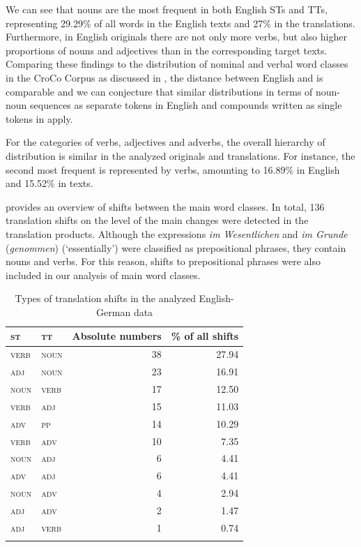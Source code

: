 \documentclass[output=paper]{LSP/langsci}
\begin{document}
We can see that nouns are the most frequent  in both English STs and  TTs, representing 29.29\% of all words in the English texts and 27\% in the  translations. Furthermore, in English originals there are not only more verbs, but also higher proportions of nouns and adjectives than in the corresponding  target texts. Comparing these findings to the distribution of nominal and verbal word classes in the CroCo Corpus as discussed in , the distance between English and  is comparable and we can conjecture that similar distributions in terms of noun-noun sequences as separate tokens in English and compounds written as single tokens in  apply. 

For the categories of verbs, adjectives and adverbs, the overall hierarchy of distribution is similar in the analyzed originals and translations. For instance, the second most frequent  is represented by verbs, amounting to 16.89\% in English and 15.52\% in  texts.

 provides an overview of shifts between the main word classes. In total, 136 translation shifts on the level of the main  changes were detected in the translation products.  Although the expressions \textit{im Wesentlichen} and \textit{im Grunde} (\textit{genommen}) (`essentially') were classified as prepositional phrases, they contain nouns and verbs. For this reason, shifts to prepositional phrases were also included in our analysis of main word classes. 

\begin{table}
\centering
\begin{tabular}{>{\scshape}l >{\scshape}l r r}
\lsptoprule
st   & tt &  Absolute numbers &  \% of all shifts \\ \midrule
verb & noun &  38 &  27.94\\
adj  & noun &  23 &  16.91\\
noun & verb &  17 &  12.50\\
verb & adj &  15 &  11.03\\
adv  & pp &  14 &  10.29\\
verb & adv &  10 &  7.35\\
noun & adj &  6 &  4.41\\
adv  & adj &  6 &  4.41\\
noun & adv &  4 &  2.94\\
adj  & adv &  2 &  1.47\\
adj  & verb &  1 &  0.74\\
\lspbottomrule
\end{tabular}
\caption{Types of translation shifts in the analyzed English-German data}
\label{serbinaetal:tab:4}
\end{table}
\end{document}
